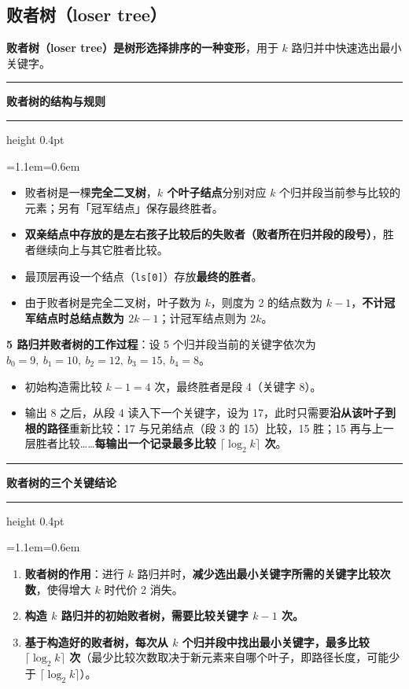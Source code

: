\documentclass[11pt,openany,UTF8]{ctexbook}
\newcommand{\callouthead}[2]{%
  \par\addvspace{7pt}\noindent
  {\color{#1}\rule[-0.15em]{3pt}{1.05em}}\hspace{0.5em}%
  {\bfseries\color{#1}#2}\par\nobreak\vspace{-0.35em}%
  {\color{rulesep}\hrule height 0.4pt}\nobreak\vspace{0.45em}%
  \begingroup\small\setlength{\parindent}{0pt}%
  \leftskip=1.1em\rightskip=0.6em\noindent\ignorespaces}
\newcommand{\calloutend}{\par\endgroup\addvspace{7pt}}
\newenvironment{callkey}[1]{\callouthead{keybar}{#1}}{\calloutend}
\begin{document}
\subsection{败者树（loser tree）}

\textbf{败者树（loser tree）是树形选择排序的一种变形}，用于 $k$ 路归并中快速选出最小关键字。

\begin{callkey}{败者树的结构与规则}
\begin{itemize}
\item 败者树是一棵\textbf{完全二叉树}，\textbf{$k$ 个叶子结点}分别对应 $k$ 个归并段当前参与比较的元素；另有「冠军结点」保存最终胜者。
\item \textbf{双亲结点中存放的是左右孩子比较后的失败者（败者所在归并段的段号）}，胜者继续向上与其它胜者比较。
\item 最顶层再设一个结点（\texttt{ls[0]\allowbreak{}}）存放\textbf{最终的胜者}。
\item 由于败者树是完全二叉树，叶子数为 $k$，则度为 2 的结点数为 $k-1$，\textbf{不计冠军结点时总结点数为 $2k-1$}；计冠军结点则为 $2k$。
\end{itemize}
\end{callkey}

\textbf{5 路归并败者树的工作过程}：设 5 个归并段当前的关键字依次为 $b_0=9,\ b_1=10,\ b_2=12,\ b_3=15,\ b_4=8$。

\begin{itemize}
\item 初始构造需比较 $k-1=4$ 次，最终胜者是段 4（关键字 8）。
\item 输出 8 之后，从段 4 读入下一个关键字，设为 17，此时只需要\textbf{沿从该叶子到根的路径}重新比较：17 与兄弟结点（段 3 的 15）比较，15 胜；15 再与上一层胜者比较……\textbf{每输出一个记录最多比较 $\lceil\log_2 k\rceil$ 次}。
\end{itemize}
\begin{callkey}{败者树的三个关键结论}
\begin{enumerate}
\item \textbf{败者树的作用}：进行 $k$ 路归并时，\textbf{减少选出最小关键字所需的关键字比较次数}，使得增大 $k$ 时代价 2 消失。
\item \textbf{构造 $k$ 路归并的初始败者树，需要比较关键字 $k-1$ 次。}
\item \textbf{基于构造好的败者树，每次从 $k$ 个归并段中找出最小关键字，最多比较 $\lceil\log_2 k\rceil$ 次}（最少比较次数取决于新元素来自哪个叶子，即路径长度，可能少于 $\lceil\log_2 k\rceil$）。
\end{enumerate}
\end{callkey}
\end{document}
